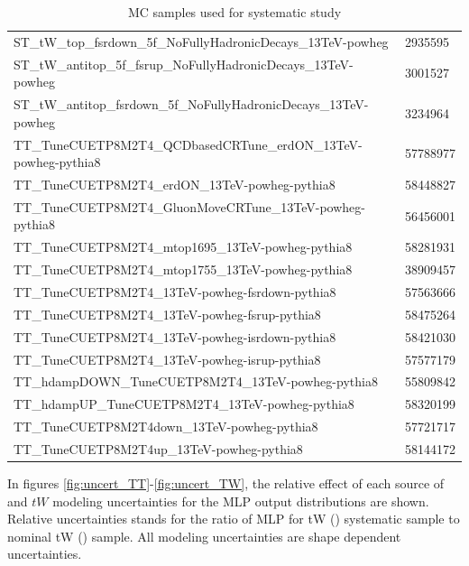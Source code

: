\begin{table}[h]
{\begin{tabular}{l|l}
ST\_tW\_top\_fsrdown\_5f\_NoFullyHadronicDecays\_13TeV-powheg                &2935595\\
ST\_tW\_antitop\_5f\_fsrup\_NoFullyHadronicDecays\_13TeV-powheg              &3001527\\
ST\_tW\_antitop\_fsrdown\_5f\_NoFullyHadronicDecays\_13TeV-powheg            &3234964\\
\hline
TT\_TuneCUETP8M2T4\_QCDbasedCRTune\_erdON\_13TeV-powheg-pythia8              &57788977\\
TT\_TuneCUETP8M2T4\_erdON\_13TeV-powheg-pythia8                              &58448827\\
TT\_TuneCUETP8M2T4\_GluonMoveCRTune\_13TeV-powheg-pythia8                    &56456001\\
TT\_TuneCUETP8M2T4\_mtop1695\_13TeV-powheg-pythia8                           &58281931\\
TT\_TuneCUETP8M2T4\_mtop1755\_13TeV-powheg-pythia8                           &38909457\\
TT\_TuneCUETP8M2T4\_13TeV-powheg-fsrdown-pythia8                             &57563666\\
TT\_TuneCUETP8M2T4\_13TeV-powheg-fsrup-pythia8                               &58475264\\
TT\_TuneCUETP8M2T4\_13TeV-powheg-isrdown-pythia8                             &58421030\\
TT\_TuneCUETP8M2T4\_13TeV-powheg-isrup-pythia8                               &57577179\\
TT\_hdampDOWN\_TuneCUETP8M2T4\_13TeV-powheg-pythia8                          &55809842\\
TT\_hdampUP\_TuneCUETP8M2T4\_13TeV-powheg-pythia8                            &58320199\\
TT\_TuneCUETP8M2T4down\_13TeV-powheg-pythia8                                 &57721717\\
TT\_TuneCUETP8M2T4up\_13TeV-powheg-pythia8                                   &58144172\\
\hline
\hline
\end{tabular}}
\caption{MC samples used for systematic study}
\label{mc-samples-sys}
\end{table}


 In figures \ref{fig:uncert_TT}-\ref{fig:uncert_TW}, the relative effect of each source of \ttbar~ and $tW$ modeling uncertainties for the MLP output distributions are shown. Relative uncertainties stands for the ratio of MLP for tW (\ttbar) systematic sample to nominal tW (\ttbar) sample. All modeling uncertainties are shape dependent uncertainties.


